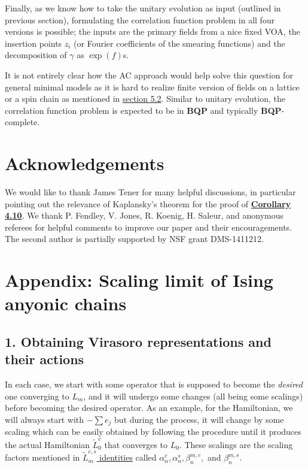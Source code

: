 \documentclass[twoside,11pt,titlepage]{amsart}
\makeatletter
\newcommand{\addresseshere}{%
  \enddoc@text\let\enddoc@text\relax
}
\renewcommand{\=}[1]{\stackrel{#1}{=}} %
\theoremstyle{definition}
\theoremstyle{remark}
\makeatother
\begin{document}
Finally, as we know how to take the unitary evolution as input (outlined in previous section), formulating the correlation function problem in all four versions is possible; the inputs are the primary fields from a nice fixed VOA, the insertion points $z_i$ (or Fourier coefficients of the smearing functions) and the decomposition of $\gamma$ as $\exp(f)$s. 

It is not entirely clear how the AC approach would help solve this question for general minimal models as it is hard to realize finite version of fields on a lattice or a spin chain as mentioned in \hyperref[5.2]{section 5.2}. Similar to unitary evolution, the correlation function problem is expected to be in \textbf{BQP} and typically \textbf{BQP}-complete.

\section*{Acknowledgements}

We would like to thank James Tener for many helpful discussions, in particular pointing out the relevance of Kaplansky's theorem for the proof of \hyperref[cor4.10]{\textbf{Corollary 4.10}}. We thank P. Fendley, V. Jones, R. Koenig, H. Saleur, and anonymous referees for helpful comments to improve our paper and their encouragements.  The second author is partially supported by NSF grant DMS-1411212.






\address{\textsuperscript{1\label{1}}Dept of Mathematics, University of California,
Santa Barbara, CA 93106-6105, U.S.A.}
\address{\textsuperscript{2\label{2}}Microsoft Station Q and Dept of Mathematics, University of California,
Santa Barbara, CA 93106-6105, U.S.A.} 
\addresseshere

\appendix
\section*{Appendix: Scaling limit of Ising anyonic chains}\label{A}

\subsection*{1. Obtaining Virasoro representations and their actions}\label{A.1}

\hfill \break 
In each case, we start with some operator that is supposed to become the \textit{desired} one converging to $L_m$, and it will undergo some changes (all being some scalings) before becoming the desired operator. As an example, for the Hamiltonian, we will always start with $-\sum e_j$ but during the process, it will change by some scaling which can be easily obtained by following the procedure until it produces the actual Hamiltonian $\widetilde{L}_0^c$ that converges to $L_0$. These scalings are the scaling factors mentioned in \hyperref[identities]{$\widetilde{L}_m^{c,s}$ identities} called $\alpha_n^c,\alpha_n^s,\beta_n^{m,c},$ and $\beta_n^{m,s}$. 
\end{document}

